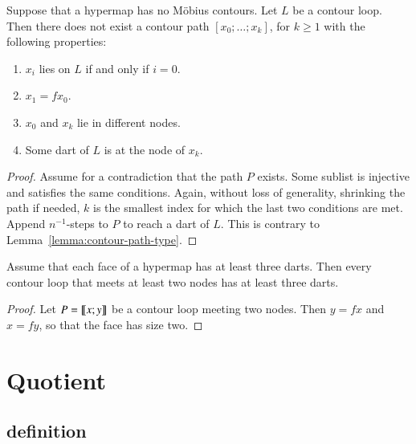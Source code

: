 \begin{lemma}
Suppose that a hypermap has no M\"obius contours.  Let $L$ be a
contour loop.  Then there does not exist a contour path
$[x_0;\ldots;x_k]$, for $k\ge 1$ with the following properties:
\begin{enumerate}
\item $x_i$ lies on $L$ if and only if $i=0$.
\item $x_1 = f x_0$.
\item $x_0$ and $x_k$ lie in different nodes.
\item Some dart of $L$ is at the node of $x_k$.
\end{enumerate}
\end{lemma}


\begin{proof} Assume for a contradiction that the path $P$ exists.
Some sublist is injective and satisfies the same conditions.  Again,
without loss of generality, shrinking the path if needed, $k$ is the
smallest index for which the last two conditions are met.  Append
$n^{-1}$-steps to $P$ to reach a dart of $L$.  This is contrary to
Lemma~\ref{lemma:contour-path-type}.
\end{proof}

\begin{lemma}\label{lemma:3dart}  
Assume that each face of a hypermap  has at least three darts.
Then every contour loop that meets at least two nodes has at least
three darts.
\end{lemma}

\begin{proof} Let $P={\llbracket{x;y}\rrbracket}$ be a contour loop meeting two nodes.  Then
$y = f x$ and $x = f y$, so that the face has size two.
\end{proof}


\section{Quotient}
%

\subsection{definition}

